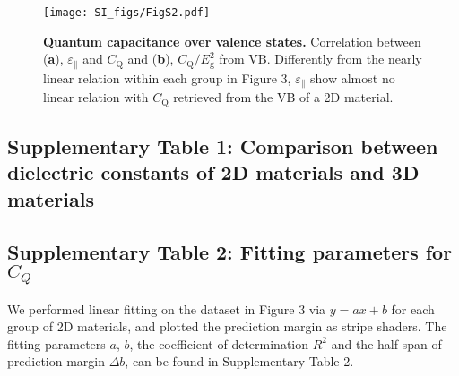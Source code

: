 \documentclass[journal=ancac3,manuscript=article,email=true,hyperref=true,keywords=true]{achemso}
\begin{document}









\pagebreak{}


\pagebreak{}





\begin{figure}[!htbp]
  \centering
  \texttt{[image: SI\_figs/FigS2.pdf]}
    \caption{{\bf Quantum capacitance over valence states.} Correlation between (\textbf{a}), $\varepsilon_{\parallel}$ and
    $C_{\mathrm{Q}}$ and (\textbf{b}),
    $C_{\mathrm{Q}}/E_{\mathrm{g}}^{2}$ from VB. Differently from the
    nearly linear relation within each group in Figure 3,
    $\varepsilon_{\parallel}$ show almost no linear relation with
    $C_{\mathrm{Q}}$ retrieved from the VB of a 2D material.}
\label{fig-S9}
\end{figure}

\pagebreak{}



\subsection{Supplementary Table 1: Comparison between dielectric constants of 2D materials and 3D materials}


\subsection{Supplementary Table 2: Fitting parameters for $C_{Q}$ }

We performed linear fitting on the dataset in Figure 3 via $y=ax+b$
for each group of 2D materials, and plotted the prediction margin as stripe shaders. 
The fitting parameters $a$, $b$, the coefficient of determination $R^2$ 
and the half-span of prediction margin $\Delta b$, can be found in Supplementary Table 2. 
\end{document}
